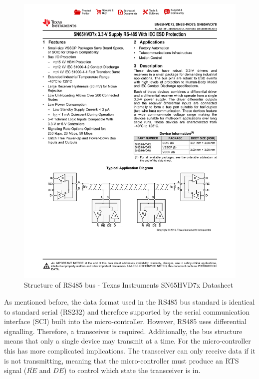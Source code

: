 \begin{figure}[H]
    \centering \includegraphics[width=1.0\textwidth]{./figures/rs485_structure.pdf}
    \caption{Structure of RS485 bus - Texas Instruments SN65HVD7x Datasheet\cite{RS485TransceiverDatasheet}}
    \label{fig:rs485_structure}
\end{figure}

As mentioned before, the data format used in the RS485 bus standard is identical to standard serial (RS232) and therefore supported by the serial communication interface (SCI) built into the micro-controller. However, RS485 uses differential signalling. Therefore, a transceiver is required. Additionally, the bus structure means that only a single device may transmit at a time. For the micro-controller this has more complicated implications. The transceiver can only receive data if it is not transmitting, meaning that the micro-controller must produce an RTS signal ($\overline{RE}$ and $DE$) to control which state the transceiver is in.

